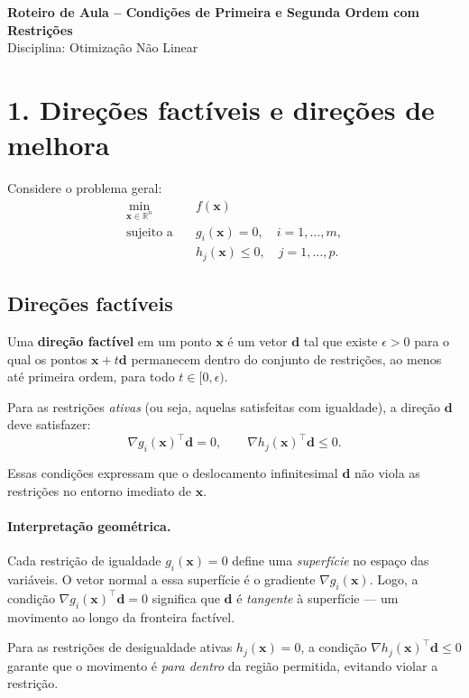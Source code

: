 \documentclass[9pt,a4paper]{extarticle}
\begin{document}
\begin{center}
  \Large \textbf{Roteiro de Aula – Condições de Primeira e Segunda Ordem com Restrições} \\[4pt]
  \normalsize Disciplina: Otimização Não Linear
\end{center}

\section*{1. Direções factíveis e direções de melhora}

Considere o problema geral:
\[
\begin{aligned}
\min_{\bm{x} \in \mathbb{R}^n} \quad & f(\bm{x}) \\
\text{sujeito a} \quad & g_i(\bm{x}) = 0, \quad i = 1, \dots, m,\\
& h_j(\bm{x}) \le 0, \quad j = 1, \dots, p.
\end{aligned}
\]

\subsection*{Direções factíveis}

Uma \textbf{direção factível} em um ponto $\bm{x}$ é um vetor $\bm{d}$ tal que existe $\epsilon > 0$ para o qual os pontos $\bm{x} + t\bm{d}$ permanecem dentro do conjunto de restrições, ao menos até primeira ordem, para todo $t \in [0,\epsilon)$.  

Para as restrições \textit{ativas} (ou seja, aquelas satisfeitas com igualdade), a direção $\bm{d}$ deve satisfazer:
\[
\nabla g_i(\bm{x})^\top \bm{d} = 0, \qquad 
\nabla h_j(\bm{x})^\top \bm{d} \le 0.
\]

Essas condições expressam que o deslocamento infinitesimal $\bm{d}$ não viola as restrições no entorno imediato de $\bm{x}$.

\paragraph{Interpretação geométrica.}
Cada restrição de igualdade $g_i(\bm{x})=0$ define uma \textit{superfície} no espaço das variáveis.  
O vetor normal a essa superfície é o gradiente $\nabla g_i(\bm{x})$.  
Logo, a condição $\nabla g_i(\bm{x})^\top \bm{d}=0$ significa que $\bm{d}$ é \textit{tangente} à superfície — um movimento ao longo da fronteira factível.  

Para as restrições de desigualdade ativas $h_j(\bm{x}) = 0$, a condição $\nabla h_j(\bm{x})^\top \bm{d} \le 0$ garante que o movimento é \textit{para dentro} da região permitida, evitando violar a restrição.
\end{document}
